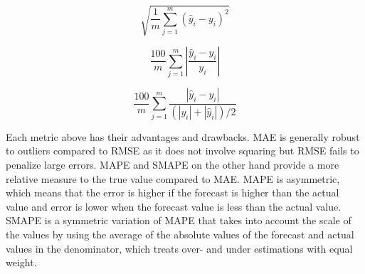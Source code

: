 \begin{equation}\label{eq:rmse}
    \sqrt{\frac{1}{m} \sum_{j=1}^m  {(\hat{y}_{i}-y_{i})}^2}
\end{equation}

\begin{equation}\label{eq:mape}
    \frac{100}{m} \sum_{j=1}^m |\frac{\hat{y}_{i}-y_{i}}{y_{i}}|
\end{equation}

\begin{equation}\label{eq:smape}
    \frac{100}{m}\sum_{j=1}^m \frac{|\hat{y}_{i} - y_{i}|}{(|y_{i}| + |\hat{y}_{i}|)/2}
\end{equation}

Each metric above has their advantages and drawbacks. MAE is generally robust to outliers compared to RMSE as it does not involve squaring but RMSE fails to penalize large errors. MAPE and SMAPE on the other hand provide a more relative measure to the true value compared to MAE. MAPE is asymmetric, which means that the error is higher if the forecast is higher than the actual value and error is lower when the forecast value is less than the actual value. SMAPE is a symmetric variation of MAPE that takes into account the scale of the values by using the average of the absolute values of the forecast and actual values in the denominator, which treats over- and under estimations with equal weight. 





